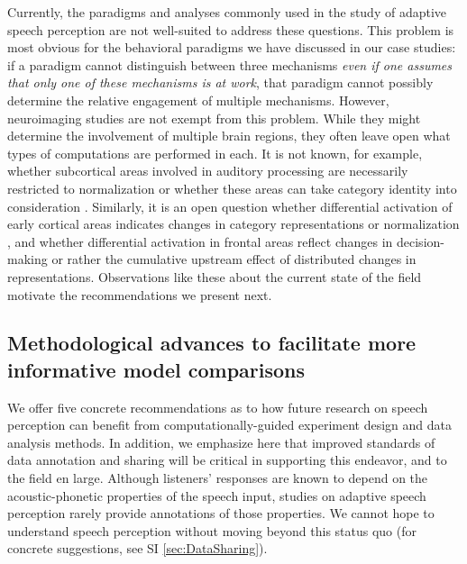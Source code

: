 \documentclass[
  11pt,
  man,floatsintext]{apa6}
\begin{document}
Currently, the paradigms and analyses commonly used in the study of adaptive speech perception are not well-suited to address these questions. This problem is most obvious for the behavioral paradigms we have discussed in our case studies: if a paradigm cannot distinguish between three mechanisms \emph{even if one assumes that only one of these mechanisms is at work}, that paradigm cannot possibly determine the relative engagement of multiple mechanisms. However, neuroimaging studies are not exempt from this problem. While they might determine the involvement of multiple brain regions, they often leave open what types of computations are performed in each. It is not known, for example, whether subcortical areas involved in auditory processing are necessarily restricted to normalization or whether these areas can take category identity into consideration \autocite[e.g., through documented feedback projections from cortical areas,][]{Erb2013}. Similarly, it is an open question whether differential activation of early cortical areas indicates changes in category representations or normalization \autocite[e.g., the involvement of Heschl's gyrus in adaptive speech perception,][]{sjerps2019}, and whether differential activation in frontal areas reflect changes in decision-making \autocite[as seems to be assumed in, e.g.,][]{myers-mesite2014} or rather the cumulative upstream effect of distributed changes in representations. Observations like these about the current state of the field motivate the recommendations we present next.

\hypertarget{sec:methodological-advances}{%
\subsection{Methodological advances to facilitate more informative model comparisons}\label{sec:methodological-advances}}

We offer five concrete recommendations as to how future research on speech perception can benefit from computationally-guided experiment design and data analysis methods. In addition, we emphasize here that improved standards of data annotation and sharing will be critical in supporting this endeavor, and to the field en large. Although listeners' responses are known to depend on the acoustic-phonetic properties of the speech input, studies on adaptive speech perception rarely provide annotations of those properties. We cannot hope to understand speech perception without moving beyond this status quo (for concrete suggestions, see SI \ref{sec:DataSharing}).
\end{document}

